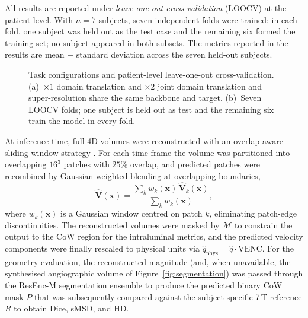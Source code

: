 All results are reported under \emph{leave-one-out cross-validation}
(LOOCV) at the patient level. With $n=7$ subjects, seven independent
folds were trained: in each fold, one subject was held out as the test
case and the remaining six formed the training set; no subject
appeared in both subsets. The metrics reported in the results are
mean $\pm$ standard deviation across the seven held-out subjects.

\begin{figure}[!htbp]
    \centering
    \caption{Task configurations and patient-level leave-one-out
    cross-validation. (a)~$\times 1$ domain translation and $\times 2$
    joint domain translation and super-resolution share the same
    backbone and target. (b)~Seven LOOCV folds; one subject is held out
    as test and the remaining six train the model in every fold.}
    \label{fig:tasks_loocv}
\end{figure}

At inference time, full 4D volumes were reconstructed with an
overlap-aware sliding-window strategy
\cite{cardoso2022monai,ronneberger2015unet}. For each time frame the
volume was partitioned into overlapping $16^{3}$ patches with $25\%$
overlap, and predicted patches were recombined by Gaussian-weighted
blending at overlapping boundaries,
\begin{equation}
    \hat{\mathbf{V}}(\mathbf{x})
    = \frac{\sum_{k} w_{k}(\mathbf{x})\,\hat{\mathbf{V}}_{k}(\mathbf{x})}
           {\sum_{k} w_{k}(\mathbf{x})},
\end{equation}
where $w_k(\mathbf{x})$ is a Gaussian window centred on patch $k$,
eliminating patch-edge discontinuities. The reconstructed volumes were
masked by $\mathcal{M}$ to constrain the output to the CoW region for
the intraluminal metrics, and the predicted velocity components were
finally rescaled to physical units via
$\hat{q}_{\text{phys}} = \hat{q}\cdot\mathrm{VENC}$. For the geometry
evaluation, the reconstructed magnitude (and, when unavailable, the
synthesised angiographic volume of Figure~\ref{fig:segmentation}) was passed
through the ResEnc-M segmentation ensemble to produce the predicted
binary CoW mask $P$ that was subsequently compared against the
subject-specific 7\,T reference $R$ to obtain Dice, sMSD, and HD.

